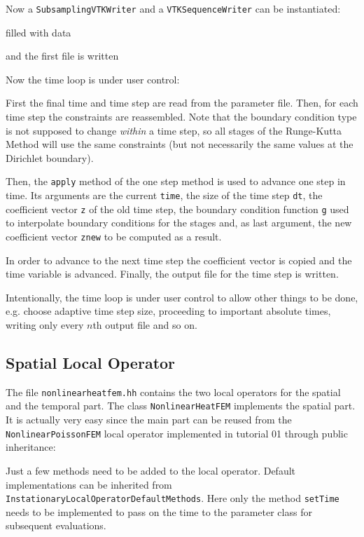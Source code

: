 \documentclass[a4paper,12pt]{article}
\begin{document}
Now a \lstinline{SubsamplingVTKWriter} and a \lstinline{VTKSequenceWriter}
can be instantiated:

filled with data

and the first file is written


Now the time loop is under user control:

First the final time and time step are read from the parameter
file. Then, for each time step the constraints are reassembled. Note that
the boundary condition type is not supposed to
change \textit{within} a time step, so all stages of the Runge-Kutta Method
will use the same constraints (but not necessarily the same values at the
Dirichlet boundary).

Then, the \lstinline{apply} method of the one step method is used to
advance one step in time. Its arguments are the current \lstinline{time}, the
size of the time step \lstinline{dt}, the coefficient vector \lstinline{z} of the old
time step, the boundary condition function \lstinline{g} used to interpolate
boundary conditions for the stages and, as last argument, the new coefficient
vector \lstinline{znew} to be computed as a result.

In order to advance to the next time step the coefficient vector is copied and the
time variable is advanced. Finally, the output file for the time step is written.

Intentionally, the time loop is under user control to allow other things to be done,
e.g. choose adaptive time step size, proceeding to important absolute times,
writing only  every $n$th output file and so on.

\subsection{Spatial Local Operator}

The file \lstinline{nonlinearheatfem.hh} contains the two local operators
for the spatial and the temporal part. The class \lstinline{NonlinearHeatFEM} implements the
spatial part. It is actually very easy since the main part can be reused
from the \lstinline{NonlinearPoissonFEM} local operator  implemented in tutorial 01 through
public inheritance:

Just a few methods need to be added to the local operator.
Default implementations can be inherited from
\lstinline{InstationaryLocalOperatorDefaultMethods}. Here only the method
\lstinline{setTime} needs to be implemented to pass on the time
to the parameter class for subsequent evaluations.
\end{document}
